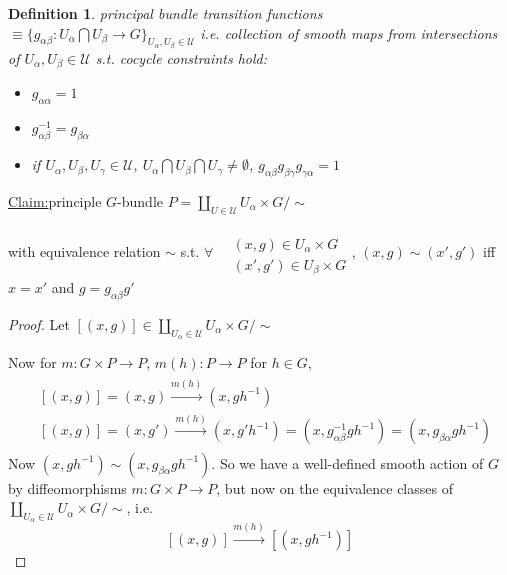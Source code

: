 \documentclass[10pt]{amsart}
\newtheorem{definition}{Definition}
\newenvironment{claim}[1]{\par\noindent\underline{Claim:}\space#1}{}
\begin{document}
\begin{multicols*}{2}
\begin{definition}
  \emph{principal bundle transition functions} $\equiv \lbrace g_{\alpha \beta} : U_{\alpha} \bigcap U_{\beta} \to G \rbrace_{U_{\alpha},U_{\beta} \in \mathcal{U}}$ i.e. collection of smooth maps from intersections of $U_{\alpha},U_{\beta} \in \mathcal{U}$ s.t. \emph{cocycle constraints} hold:
\begin{itemize}
  \item $g_{\alpha \alpha} =1$ 
  \item $g^{-1}_{\alpha \beta} = g_{\beta \alpha }$
    \item if $U_{\alpha}, U_{\beta}, U_{\gamma} \in \mathcal{U}$, $U_{\alpha} \bigcap U_{\beta} \bigcap U_{\gamma} \neq \emptyset$, $g_{\alpha \beta} g_{\beta \gamma} g_{\gamma \alpha } =1$
\end{itemize}
\end{definition}

\begin{claim}
  principle $G$-bundle $P = \coprod_{U \in \mathcal{U}} U_{\alpha} \times G / \sim$

with equivalence relation $\sim$ s.t. $\forall \, \begin{aligned} & \quad \\
  & (x,g) \in U_{\alpha} \times G \\
  & (x',g') \in U_{\beta} \times G \end{aligned}$, $(x,g) \sim (x',g')$ iff $x=x'$ and $g=g_{\alpha \beta} g'$
\end{claim}

\begin{proof}
  Let $[(x,g)] \in \coprod_{U_{\alpha} \in \mathcal{U}} U_{\alpha} \times G / \sim$

  Now for $m : G \times P \to P$, $m(h) : P \to P$ for $h\in G$, 
  \[
\begin{gathered}
  \begin{aligned}
    & [(x,g)] =(x,g) \xrightarrow{ m(h)}(x,gh^{-1}) \\ 
    & [(x,g)] = (x,g') \xrightarrow{ m(h)} (x,g'h^{-1}) = (x,g^{-1}_{\alpha \beta} gh^{-1}) = (x,g_{\beta \alpha} gh^{-1})
  \end{aligned}
\end{gathered}
\]
Now $(x,gh^{-1}) \sim (x,g_{\beta \alpha} gh^{-1})$.  So we have a well-defined smooth action of $G$ by diffeomorphisms $m: G\times P \to P$, but now on the equivalence classes of $\coprod_{U_{\alpha} \in \mathcal{U}} U_{\alpha}\times G/\sim$, i.e.
\[
[(x,g)] \xrightarrow{ m(h)} [(x,gh^{-1})]
\]  


\end{proof}
\end{multicols*}
\end{document}
